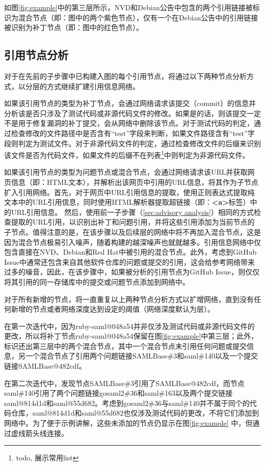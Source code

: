 \begin{exmp}
如图\ref{fig:example}中的第三层所示，NVD和Debian公告中包含的两个引用链接被标识为混合节点（即：图中的两个紫色节点），仅有一个在Debian公告中的引用链接被识别为补丁节点（即：图中的红色节点）。
\end{exmp}

\subsection{引用节点分析}
对于在先前的子步骤中已构建入图的每个引用节点，\tool 将通过以下两种节点分析方式，以分层的方式继续扩建引用信息网络。%

如果该引用节点的类型为补丁节点，\tool 会通过网络请求该提交（commit）的信息并分析该是否只涉及了测试代码或非源代码文件的修改。如果是的话，则该提交一定不是用于修复漏洞的补丁提交，\tool 会从网络中删除该节点。对于测试代码的判定，\tool 通过检查修改的文件路径中是否含有“test”字段来判断，如果文件路径含有“test”字段则判定为测试文件。对于非源代码文件的判定，\tool 通过检查修改文件的后缀来识别该文件是否为代码文件，如果文件的后缀不在列表\footnote{todo, 展示常用list}中则判定为非源代码文件。

如果该引用节点的类型为问题节点或混合节点，\tool 会通过网络请求该URL并获取网页信息（即：HTML文本），并解析出该网页中引用的URL信息，将其作为子节点扩入引用网络。首先，对于网页中URL引用信息的提取，\tool 使用正则表达式提取纯文本中的URL引用信息，同时使用HTML解析器提取超链接（即：\textbf{<a>}标签）中的URL引用信息。
然后，使用前一子步骤（\ref{sec:advisory analysis}）相同的方式检查提取的URL引用，以识别出补丁和问题引用，并将这些引用添加为当前节点的子节点。值得注意的是，在该步骤以及后续层的网络中将不再加入混合节点，这是因为混合节点极易引入噪声，随着构建的越深噪声也就就越多。引用信息网络中仅包含直接在NVD、Debian和Red Hat中被引用的混合节点。此外，考虑到GitHub Issue中通常还包含来自其他软件仓库的问题或提交的引用，这会给参考网络带来过多的噪音，因此，在该步骤中，如果被分析的引用节点为GitHub Issue，则仅仅将其引用的同一存储库中的提交或问题节点添加到网络中。

对于所有新增的节点，\tool 将一直重复以上两种节点分析方式以扩增网络，直到没有任何新增的节点或者网络深度达到设定的阈值（网络深度默认为层）。

\begin{exmp}
    在第一次迭代中，因为ruby-saml@048a54并非仅涉及测试代码或非源代码文件的更改，所以\tool 将补丁节点ruby-saml@048a54保留在图\ref{fig:example}中第三层；此外，\tool 标识还出第三层中的两个混合节点，其中一个混合节点未引用任何问题或提交信息，另一个混合节点了引用两个问题链接SAMLBase\#3和saml\#140以及一个提交链接SAMLBase@482cdf。 

    在第二次迭代中，\tool 发现节点SAMLBase\#3引用了SAMLBase@482cdf，而节点saml\#140引用了两个问题链接gosaml2\#36和saml\#163以及两个提交链接saml@814d1d和saml@55d682。考虑到gosaml2\#36与saml\#140并不属于同个的代码仓库，saml@814d1d和saml@55d682也仅涉及测试代码的更改，\tool 不将它们添加到网络中。为了便于示例讲解，这些未添加的节点仍显示在图\ref{fig:example} 中，但通过虚线箭头线连接。 %
\end{exmp}

